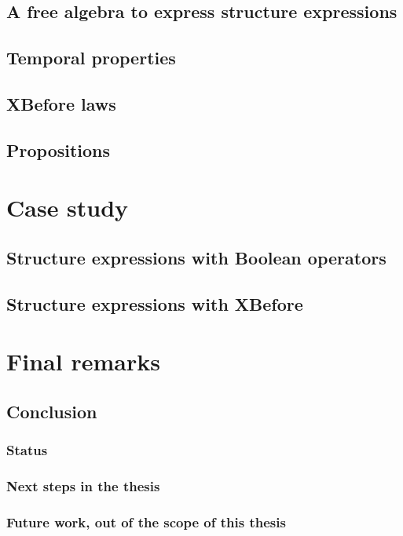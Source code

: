 \documentclass{beamer}
\begin{document}
\subsection{A free algebra to express structure expressions}
\subsection{Temporal properties}
\subsection{XBefore laws}
\subsection{Propositions}

\section{Case study}
\subsection{Structure expressions with Boolean operators}
\subsection{Structure expressions with XBefore}

\section{Final remarks}
\subsection{Conclusion}

\begin{frame}
\frametitle{Status}
\end{frame}

\begin{frame}
\frametitle{Next steps in the thesis}
\end{frame}

\begin{frame}
\frametitle{Future work, out of the scope of this thesis}
\end{frame}

\end{document}
